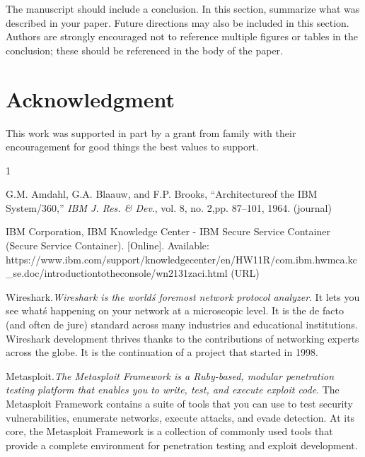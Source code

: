 \documentclass[]{IEEEibm}
\begin{document}
The manuscript should include a conclusion. In this section, summarize what was described in your paper. Future directions may also be included in this section. Authors are strongly encouraged not to reference multiple figures or tables in the conclusion; these should be referenced in the body of the paper.

\section{Acknowledgment}

This work was supported in part by a grant from family with their encouragement for good things the best values to support.


\begin{thebibliography}{1}

G.M. Amdahl, G.A. Blaauw, and F.P. Brooks, ``Architecture\break of the IBM System/360,'' {\it IBM J. Res. \& Dev}., vol. 8, no. 2,\break pp. 87--101, 1964. (journal)

IBM Corporation, IBM Knowledge Center - IBM Secure Service Container (Secure Service Container). [Online]. Available: {https://www.ibm.com/support/knowledgecenter/en/HW11R/\break com.ibm.hwmca.kc\_se.doc/introductiontotheconsole/wn2131zaci.html} (URL)

\end{thebibliography}


\begin{IEEEbiography}{Wireshark.}\textit{Wireshark is the world\'s foremost network protocol analyzer}. It lets you see what\'s happening on your network at a microscopic level. It is the de facto (and often de jure) standard across many industries and educational institutions. Wireshark development thrives thanks to the contributions of networking experts across the globe. It is the continuation of a project that started in 1998.
\end{IEEEbiography}

\begin{IEEEbiography}{Metasploit.}\textit{The Metasploit Framework is a Ruby-based, modular penetration testing platform that enables you to write, test, and execute exploit code}. The Metasploit Framework contains a suite of tools that you can use to test security vulnerabilities, enumerate networks, execute attacks, and evade detection. At its core, the Metasploit Framework is a collection of commonly used tools that provide a complete environment for penetration testing and exploit development.
\end{IEEEbiography}
\end{document}
